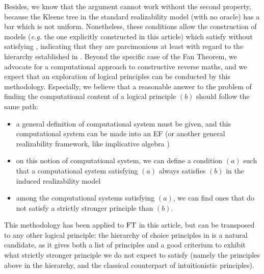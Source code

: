\documentclass[a4paper,UKenglish,cleveref, autoref, thm-restate]{lipics-v2021}
\begin{document}
Besides, we know that the argument cannot work without the second property,
because the Kleene tree in the standard realizability model (with no oracle)
has a bar which is not uniform. Nonetheless, these conditions allow the
construction of models (\textit{e.g.} the one explicitly constructed in this
article) which satisfy \FT without satisfying \WKL, indicating that they are
parcimonious at least with regard to the hierarchy established in \cite{BreHer21}.
%
%
Beyond the specific case of the Fan Theorem, we advocate for a computational approach
to constructive reverse maths, and we expect that an exploration of logical principles
can be conducted by this methodology.
Especially, we believe that a reasonable answer to the problem of
finding the computational content of a logical
principle $(b)$ should follow the same path:
\begin{itemize}
\item a general definition of computational system must be given,
and this computational system can be made into an EF
(or another general realizability framework, like implicative algebra \cite{Miquel20})
\item on this notion of computational system, we can define a condition $(a)$
such that a computational system satisfying $(a)$ always satisfies $(b)$ in the
induced realizability model
\item among the computational systems satisfying $(a)$, we can find ones
that do not satisfy a strictly stronger principle than $(b)$.
\end{itemize}
This methodology has been applied to $\mathrm{FT}$ in this article,
but can be transposed to any other logical principle:
the hierarchy of choice principles in \cite{BreHer21} is a natural
candidate, as it gives both a list of principles and a good criterium
to exhibit what strictly stronger principle we do not expect to satisfy
(namely the principles above in the hierarchy, and the classical counterpart
of intuitionistic principles).

\end{document}

